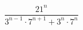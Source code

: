 \begin{ex}[type=expression]
	\begin{condition}
		\( \dfrac{21^n}{3^{n-1}\cdot7^{n+1}+3^n\cdot7^n} \)
	\end{condition}
\end{ex}
